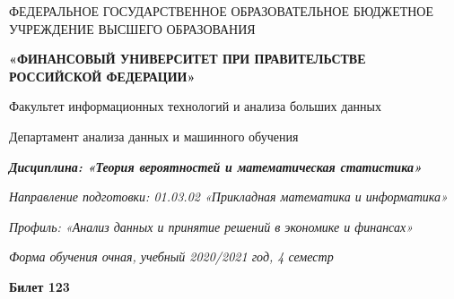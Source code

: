 \documentclass[a4paper,10pt]{article}
\begin{document}
\begin{center}
ФЕДЕРАЛЬНОЕ ГОСУДАРСТВЕННОЕ ОБРАЗОВАТЕЛЬНОЕ БЮДЖЕТНОЕ УЧРЕЖДЕНИЕ ВЫСШЕГО ОБРАЗОВАНИЯ

    \textbf{«ФИНАНСОВЫЙ УНИВЕРСИТЕТ ПРИ ПРАВИТЕЛЬСТВЕ РОССИЙСКОЙ ФЕДЕРАЦИИ»}

Факультет информационных технологий и анализа больших данных

Департамент анализа данных и машинного обучения

\textit{
	\textbf{Дисциплина: «Теория вероятностей и математическая статистика»}}

\textit{Направление подготовки: 01.03.02 «Прикладная математика и информатика»}

\textit{Профиль: «Анализ данных и принятие решений в экономике и финансах»}

\textit{Форма обучения очная, учебный 2020/2021 год, 4 семестр}

\textbf{Билет 123}

\end{center}
\end{document}
